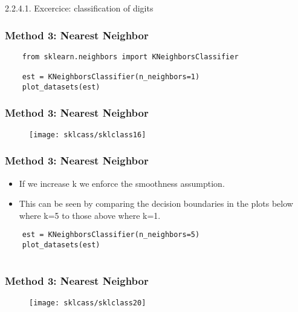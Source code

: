 2.2.4.1. Excercice: classification of digits\documentclass[MASTER.tex]{subfiles}
\begin{document}

	\frametitle{Method 3: Nearest Neighbor}
	\large
	\begin{framed}
		\begin{verbatim}
	from sklearn.neighbors import KNeighborsClassifier
	
	est = KNeighborsClassifier(n_neighbors=1)
	plot_datasets(est)
		\end{verbatim}
	\end{framed}



	\frametitle{Method 3: Nearest Neighbor}
	\begin{figure}
		\centering
		\texttt{[image: sklcass/sklclass16]}
		
	\end{figure}


	\frametitle{Method 3: Nearest Neighbor}
	\Large
	\begin{itemize}
\item If we increase k we enforce the smoothness assumption. 
\item This can be seen by comparing the decision boundaries in the plots below where k=5 to those above where k=1.
	\end{itemize}
	{
		\large
	\begin{framed}
	\begin{verbatim}
	est = KNeighborsClassifier(n_neighbors=5)
	plot_datasets(est)
	
	\end{verbatim}
 \end{framed}
}


	\frametitle{Method 3: Nearest Neighbor}
\begin{figure}
\centering
\texttt{[image: sklcass/sklclass20]}

\end{figure}
\end{document}
